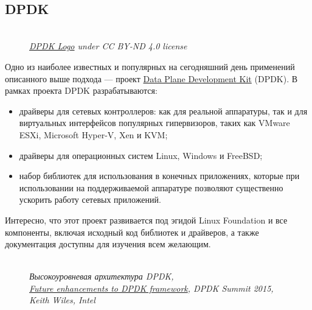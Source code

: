 \documentclass[14pt, a4paper]{article}
\begin{document}
\begin{figure}[h]
    \centering
    \\  
    \label{framework} 
\end{figure}

\subsection*{DPDK} 

\begin{figure}[h]
    \centering
    \\ 
    \small\textit{\href{http://fast.dpdk.org/download/logos/}{DPDK Logo} under CC BY-ND 4.0 license}  
    \label{framework} 
\end{figure}

Одно из наиболее известных и популярных на сегодняшний день применений описанного выше
подхода — проект \href{https://www.dpdk.org/}{Data Plane Development Kit} (DPDK). В рамках проекта DPDK разрабатываются:

\begin{itemize}
    \item драйверы для сетевых контроллеров: как для реальной аппаратуры, так и для виртуальных
    интерфейсов популярных гипервизоров, таких как VMware ESXi, Microsoft Hyper-V, Xen и KVM;
    \item драйверы для операционных систем Linux, Windows и FreeBSD;
    \item набор библиотек для использования в конечных приложениях, которые при использовании на
    поддерживаемой аппаратуре позволяют существенно ускорить работу сетевых приложений.
\end{itemize}

Интересно, что этот проект развивается под эгидой Linux Foundation и все компоненты, включая
исходный код библиотек и драйверов, а также документация доступны для изучения всем желающим.\\

\begin{figure}[h]
    \centering
    \\ 
    \small\textit{Высокоуровневая архитектура DPDK,\\
    \href{https://www.slideshare.net/jstleger/dpdk-summit-2015-intel-keith-wiles}{Future enhancements to DPDK framework}, DPDK Summit 2015, Keith Wiles, Intel}  
    \label{framework} 
\end{figure}
\end{document}

